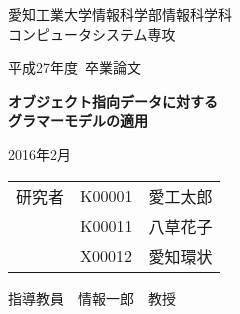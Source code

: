 \thispagestyle{myheadings}

\vspace{-1.0cm}

\begin{center}

{\LARGE 愛知工業大学情報科学部情報科学科\\
コンピュータシステム専攻

\vspace{1.0cm}

平成27年度~卒業論文\\

\vspace{2.0cm}

{\Huge 
\baselineskip=15mm
\textbf{オブジェクト指向データに対する\\
グラマーモデルの適用\\}}

\vspace{7.0cm}

2016年2月\\

\vspace{1.0cm}

\begin{tabular}[h]{lll}
  研究者  & K00001 & 愛工太郎\\
         & K00011 & 八草花子\\
         & X00012 & 愛知環状\\
\end{tabular}

\vspace{1.0cm}

指導教員\ \ 情報一郎\ \ 教授}

\end{center}

